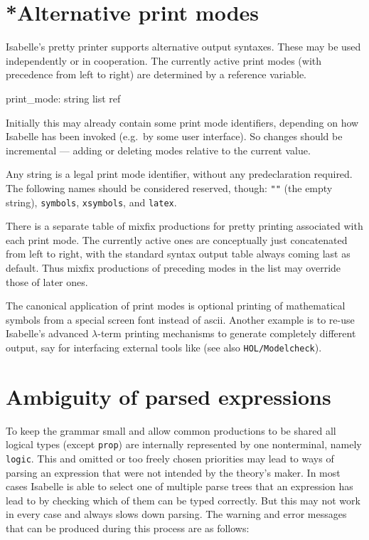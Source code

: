 

\section{*Alternative print modes} \label{sec:prmodes}
%
Isabelle's pretty printer supports alternative output syntaxes.  These
may be used independently or in cooperation.  The currently active
print modes (with precedence from left to right) are determined by a
reference variable.
\begin{ttbox}
print_mode: string list ref
\end{ttbox}
Initially this may already contain some print mode identifiers,
depending on how Isabelle has been invoked (e.g.\ by some user
interface).  So changes should be incremental --- adding or deleting
modes relative to the current value.

Any \ML{} string is a legal print mode identifier, without any predeclaration
required.  The following names should be considered reserved, though:
\texttt{""} (the empty string), \texttt{symbols}, \texttt{xsymbols}, and
\texttt{latex}.

There is a separate table of mixfix productions for pretty printing
associated with each print mode.  The currently active ones are
conceptually just concatenated from left to right, with the standard
syntax output table always coming last as default.  Thus mixfix
productions of preceding modes in the list may override those of later
ones.

\medskip The canonical application of print modes is optional printing
of mathematical symbols from a special screen font instead of {\sc
  ascii}.  Another example is to re-use Isabelle's advanced
$\lambda$-term printing mechanisms to generate completely different
output, say for interfacing external tools like  (see also \texttt{HOL/Modelcheck}).



\section{Ambiguity of parsed expressions} \label{sec:ambiguity}

To keep the grammar small and allow common productions to be shared
all logical types (except {\tt prop}) are internally represented
by one nonterminal, namely {\tt logic}.  This and omitted or too freely
chosen priorities may lead to ways of parsing an expression that were
not intended by the theory's maker.  In most cases Isabelle is able to
select one of multiple parse trees that an expression has lead
to by checking which of them can be typed correctly.  But this may not
work in every case and always slows down parsing.
The warning and error messages that can be produced during this process are
as follows:

